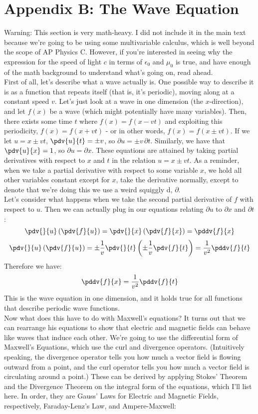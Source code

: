 \section*{Appendix B: The Wave Equation}
Warning: This section is very math-heavy. I did not include it in the main text because we're going to be using some multivariable calculus, which is well beyond the scope of AP Physics C. However, if you're interested in seeing why the expression for the speed of light $c$ in terms of $\epsilon_0$ and $\mu_0$ is true, and have enough of the math background to understand what's going on, read ahead. \\
First of all, let's describe what a wave actually is. One possible way to describe it is as a function that repeats itself (that is, it's periodic), moving along at a constant speed $v$. Let's just look at a wave in one dimension (the $x$-direction), and let $f(x)$ be a wave (which might potentially have many variables). Then, there exists some time $t$ where $f(x) = f(x - vt)$ and exploiting this periodicity, $f(x) = f(x + vt)$ - or in other words, $f(x) = f(x \pm vt)$. If we let $u = x \pm vt$, $\pdv{u}{t} = \pm v$, so $\partial u = \pm v \, \partial t$. Similarly, we have that $\pdv{u}{x} = 1$, so $\partial u = \partial x$. These equations are attained by taking partial derivatives with respect to $x$ and $t$ in the relation $u = x \pm vt$. As a reminder, when we take a partial derivative with respect to some variable $x$, we hold all other variables constant except for $x$, take the derivative normally, except to denote that we're doing this we use a weird squiggly d, $\partial$. \\
Let's consider what happens when we take the second partial derivative of $f$ with respect to $u$. Then we can actually plug in our equations relating $\partial u$ to $\partial x$ and $\partial t$:
\[
	\pdv{}{u}\left(\pdv{f}{u}\right) = \pdv{}{x}\left(\pdv{f}{x}\right) = \pddv{f}{x}
\]
\[
	\pdv{}{u}\left(\pdv{f}{u}\right) = \pm\frac{1}{v}\pdv{}{t}\left(\pm\frac{1}{v}\pdv{f}{t}\right) = \frac{1}{v^2} \pddv{f}{t}
\]
Therefore we have:
\[
	\pddv{f}{x} = \frac{1}{v^2} \pddv{f}{t}
\]
This is the wave equation in one dimension, and it holds true for all functions that describe periodic wave functions.\\
Now what does this have to do with Maxwell's equations? It turns out that we can rearrange his equations to show that electric and magnetic fields can behave like waves that induce each other. We're going to use the differential form of Maxwell's Equations, which use the curl and divergence operators. (Intuitively speaking, the divergence operator tells you how much a vector field is flowing outward from a point, and the curl operator tells you how much a vector field is circulating around a point.) These can be derived by applying Stokes' Theorem and the Divergence Theorem on the integral form of the equations, which I'll list here. In order, they are Gauss' Laws for Electric and Magnetic Fields, respectively, Faraday-Lenz's Law, and Ampere-Maxwell: 

